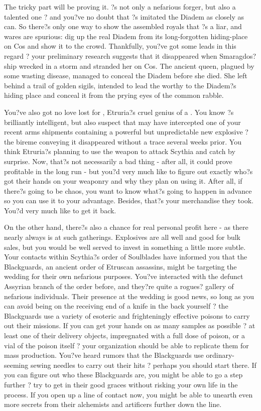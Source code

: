 \documentclass[char]{Kos}
\begin{document}
The tricky part will be proving it. \cMerchant{}?s not only a nefarious forger, but also a talented one ? and you?ve no doubt that \cMerchant{\they}?s imitated the Diadem as closely as \cMerchant{\they} can. So there?s only one way to show the assembled royals that \cMerchant{}?s a liar, and \cMerchant{\their} wares are spurious: dig up the real Diadem from its long-forgotten hiding-place on Cos and show it to the crowd. Thankfully, you?ve got some leads in this regard ? your preliminary research suggests that it disappeared when Smaragdos? ship wrecked in a storm and stranded her on Cos. The ancient queen, plagued by some wasting disease, managed to conceal the Diadem before she died. She left behind a trail of golden sigils, intended to lead the worthy to the Diadem?s hiding place and conceal it from the prying eyes of the common rabble.

You?ve also got no love lost for \cEtruriaKing{}, Etruria?s cruel genius of a \cEtruriaKing{\monarch}. You know \cEtruriaKing{\they}?s brilliantly intelligent, but also suspect that \cEtruriaKing{\they} may have intercepted one of your recent arms shipments containing a powerful but unpredictable new explosive ? the bireme conveying it disappeared without a trace several weeks prior. You think Etruria?s planning to use the weapon to attack Scythia and catch \cScythiaKing{} by surprise. Now, that?s not necessarily a bad thing - after all, it could prove profitable in the long run - but you?d very much like to figure out exactly who?s got their hands on your weaponry and why they plan on using it. After all, if there?s going to be chaos, you want to know what?s going to happen in advance so you can use it to your advantage. Besides, that?s your merchandise they took. You?d very much like to get it back.

On the other hand, there?s also a chance for real personal profit here - as there nearly always is at such gatherings. Explosives are all well and good for bulk sales, but you would be well served to invest in something a little more subtle. Your contacts within Scythia?s order of Soulblades have informed you that the Blackguards, an ancient order of Etruscan assassins, might be targeting the wedding for their own nefarious purposes. You?ve interacted with the defunct Assyrian branch of the order before, and they?re quite a rogues? gallery of nefarious individuals. Their presence at the wedding is good news, so long as you can avoid being on the receiving end of a knife in the back yourself ? the Blackguards use a variety of esoteric and frighteningly effective poisons to carry out their missions. If you can get your hands on as many samples as possible ? at least one of their delivery objects, impregnated with a full dose of poison, or a vial of the poison itself ? your organization should be able to replicate them for mass production. You?ve heard rumors that the Blackguards use ordinary-seeming sewing needles to carry out their hits ? perhaps you should start there. If you can figure out who these Blackguards are, you might be able to go a step further ? try to get in their good graces without risking your own life in the process. If you open up a line of contact now, you might be able to unearth even more secrets from their alchemists and artificers further down the line.
\end{document}
